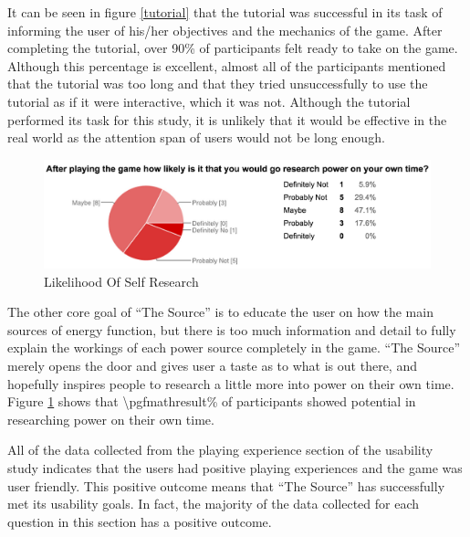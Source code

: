 \documentclass[msc,oneside]{ubcthesis}%
\newcommand{\percent}[2]{\pgfmathparse{#1*100/#2} \num{\pgfmathresult}\%}
\begin{document}
It can be seen in figure \ref{tutorial} that the tutorial was successful in its task of informing the user of his/her objectives and the mechanics of the game. After completing the tutorial, over 90\% of participants felt ready to take on the game. Although this percentage is excellent, almost all of the participants mentioned that the tutorial was too long and that they tried unsuccessfully to use the tutorial as if it were interactive, which it was not. Although the tutorial performed its task for this study, it is unlikely that it would be effective in the real world as the attention span of users would not be long enough.
\newpage
\begin{figure}[hbt]
  \begin{center}
    \includegraphics[width=1\textwidth]{survey_pics/numeric/future_learning}
    \caption[Likely hood of self Learning ]{Likelihood Of Self Research}\label{future_learning}
  \end{center}
\end{figure}

The other core goal of ``The Source'' is to educate the user on how the main sources of energy function, but there is too much information and detail to fully explain the workings of each power source completely in the game. ``The Source'' merely opens the door and gives user a taste as to what is out there, and hopefully inspires people to research a little more into power on their own time. Figure \ref{future_learning} shows that \percent{11}{17} of participants showed potential in researching power on their own time. 


All of the data collected from the playing experience section of the usability study indicates that the users had positive playing experiences and the game was user friendly. This positive outcome means that ``The Source'' has successfully met its usability goals. In fact, the majority of the data collected for each question in this section has a positive outcome.  
\end{document}
